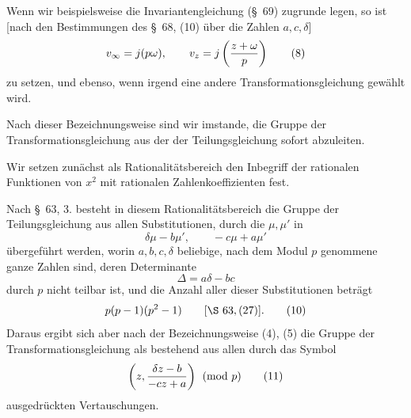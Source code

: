 \documentclass[11pt]{article}
\begin{document}
Wenn wir beispielsweise die Invariantengleichung (\S~69) zugrunde legen, so ist [nach den Bestimmungen des \S~68, (10) über die Zahlen $a,c,\delta$]
\begin{equation}
 v_\infty=j(p\omega),
 \qquad
 v_z=j\left({z+\omega\over p}\right)
\tag{8}
\end{equation}
zu setzen, und ebenso, wenn irgend eine andere Transformationsgleichung gewählt wird.

Nach dieser Bezeichnungsweise sind wir imstande, die Gruppe der Transformationsgleichung aus der der Teilungsgleichung sofort abzuleiten.

Wir setzen zunächst als Rationalitätsbereich den Inbegriff der rationalen Funktionen von $x^2$ mit rationalen Zahlenkoeffizienten fest.

Nach \S~63, 3. besteht in diesem Rationalitätsbereich die Gruppe der Teilungsgleichung aus allen Substitutionen, durch die $\mu,\mu'$ in
\[
 \delta\mu-b\mu',
 \qquad
 -c\mu+a\mu'
\]
übergeführt werden, worin $a,b,c,\delta$ beliebige, nach dem Modul $p$ genommene ganze Zahlen sind, deren Determinante
\begin{equation}
 \Delta=a\delta-bc
\tag{9}
\end{equation}
durch $p$ nicht teilbar ist, und die Anzahl aller dieser Substitutionen beträgt
\begin{equation}
 p(p-1)(p^2-1) \qquad [\S~63,(27)].
\tag{10}
\end{equation}
Daraus ergibt sich aber nach der Bezeichnungsweise (4), (5) die Gruppe der Transformationsgleichung als bestehend aus allen durch das Symbol
\begin{equation}
 \left(z,{\delta z-b\over -cz+a}\right)\pmod p
\tag{11}
\end{equation}
ausgedrückten Vertauschungen.
\end{document}
